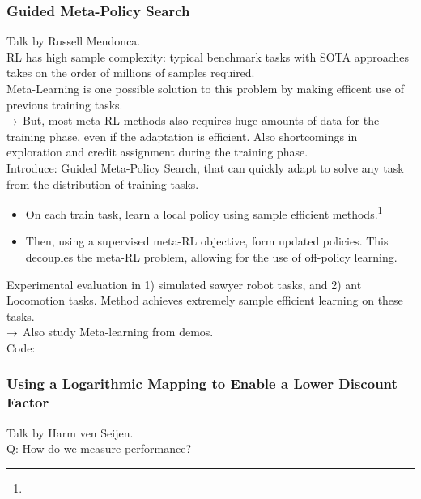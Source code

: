 \subsubsection{Guided Meta-Policy Search \cite{mendonca2019guided}}

Talk by Russell Mendonca. \\

RL has high sample complexity: typical benchmark tasks with SOTA approaches takes on the order of millions of samples required. \\

Meta-Learning is one possible solution to this problem by making efficent use of previous training tasks. \\

$\rightarrow$ But, most meta-RL methods also requires huge amounts of data for the training phase, even if the adaptation is efficient. Also shortcomings in exploration and credit assignment during the training phase. \\

Introduce: Guided Meta-Policy Search, that can quickly adapt to solve any task from the distribution of training tasks.
\begin{itemize}
    \item On each train task, learn a local policy using sample efficient methods.\footnote{}
    \item Then, using a supervised meta-RL objective, form updated policies. This decouples the meta-RL problem, allowing for the use of off-policy learning.
\end{itemize}

Experimental evaluation in 1) simulated sawyer robot tasks, and 2) ant Locomotion tasks. Method achieves extremely sample efficient learning on these tasks. \\

$\rightarrow$ Also study Meta-learning from demos. \\

Code: 

\subsubsection{Using a Logarithmic Mapping to Enable a Lower Discount Factor \cite{van2019using}}

Talk by Harm ven Seijen. \\

Q: How do we measure performance? \\

